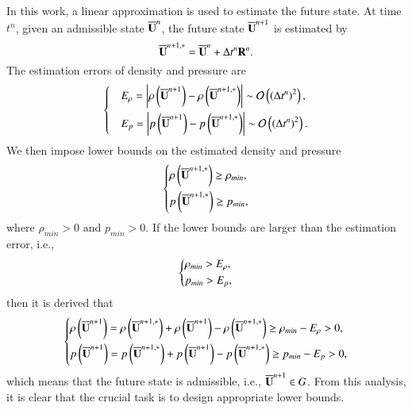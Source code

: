 In this work, a linear approximation is used to estimate the future state. At time $t^n$, given an admissible state $\overline{\mathbf{U}}^n$, the future state $\overline{\mathbf{U}}^{n+1}$ is estimated by
\begin{equation}
\label{eq:linear-approximation}
    \overline{\mathbf{U}}^{n+1,*}=\overline{\mathbf{U}}^n + \mathrm\Delta t^n \mathbf{R}^n.
\end{equation}
The estimation errors of density and pressure are
\begin{equation}
    \begin{dcases}
        &E_{\rho} = \left|\rho\left(\overline{\mathbf{U}}^{n+1}\right) - \rho\left(\overline{\mathbf{U}}^{n+1,*}\right)\right|  \sim \mathcal{O} \left(\left(\mathrm\Delta t^n\right)^2\right), \\
        &E_{p} = \left|p\left(\overline{\mathbf{U}}^{n+1}\right) - p\left(\overline{\mathbf{U}}^{n+1,*}\right)\right|  \sim \mathcal{O} \left(\left(\mathrm\Delta t^n\right)^2\right).
    \end{dcases}
\end{equation}
We then impose lower bounds on the estimated density and pressure
\begin{equation}
\begin{dcases}
\label{eq:impose-lower-bounds}
    \rho\left(\overline{\mathbf{U}}^{n+1,*}\right) \geq \rho_{min}, \\
    p\left(\overline{\mathbf{U}}^{n+1,*}\right) \geq p_{min},
\end{dcases}
\end{equation}
where $\rho_{min}>0$ and $p_{min}>0$. If the lower bounds are larger than the estimation error, i.e.,
\begin{equation}
    \begin{dcases}
        \rho_{min} > E_\rho, \\
        p_{min} > E_p,
    \end{dcases}
\end{equation}
then it is derived that
\begin{equation}
    \begin{dcases}
        \rho\left(\overline{\mathbf{U}}^{n+1}\right) = \rho\left(\overline{\mathbf{U}}^{n+1,*}\right) + \rho\left(\overline{\mathbf{U}}^{n+1}\right) - \rho\left(\overline{\mathbf{U}}^{n+1,*}\right) \geq \rho_{min} - E_\rho>0, \\
        p\left(\overline{\mathbf{U}}^{n+1}\right) = p\left(\overline{\mathbf{U}}^{n+1,*}\right) + p\left(\overline{\mathbf{U}}^{n+1}\right) - p\left(\overline{\mathbf{U}}^{n+1,*}\right) \geq p_{min} - E_p>0,
    \end{dcases}
\end{equation}
which means that the future state is admissible, i.e., $\overline{\mathbf{U}}^{n+1} \in G$. From this analysis, it is clear that the crucial task is to design appropriate lower bounds. 

